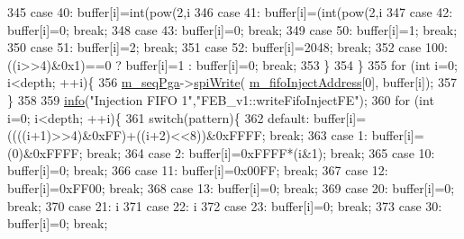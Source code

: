 \begin{DoxyCode}
345     \textcolor{keywordflow}{case} 40:  buffer[i]=int(pow(2,i%
346     \textcolor{keywordflow}{case} 41:  buffer[i]=(int(pow(2,i%
347     \textcolor{keywordflow}{case} 42:  buffer[i]=0; \textcolor{keywordflow}{break};
348     \textcolor{keywordflow}{case} 43:  buffer[i]=0; \textcolor{keywordflow}{break};
349     \textcolor{keywordflow}{case} 50:  buffer[i]=1; \textcolor{keywordflow}{break};
350     \textcolor{keywordflow}{case} 51:  buffer[i]=2; \textcolor{keywordflow}{break};
351     \textcolor{keywordflow}{case} 52:  buffer[i]=2048; \textcolor{keywordflow}{break};
352     \textcolor{keywordflow}{case} 100: ((i>>4)&0x1)==0 ? buffer[i]=1 : buffer[i]=0; \textcolor{keywordflow}{break};
353     \}
354    \}
355   \textcolor{keywordflow}{for} (\textcolor{keywordtype}{int} i=0; i<depth; ++i)\{
356     \hyperlink{classFEB__v1_a6c7804ac86796f233a8393043adf2e77}{m\_seqPga}->\hyperlink{classSeqPGA_ad4421841ce4ce8b88ad13f63216f0743}{spiWrite}( \hyperlink{classFEB__v1_afd035f292061e1823ed64471bb0228ef}{m\_fifoInjectAddress}[0], buffer[i]);
357   \}
358   
359   \hyperlink{classObject_a644fd329ea4cb85f54fa6846484b84a8}{info}(\textcolor{stringliteral}{"Injection FIFO 1"},\textcolor{stringliteral}{"FEB\_v1::writeFifoInjectFE"});        
360   \textcolor{keywordflow}{for} (\textcolor{keywordtype}{int} i=0; i<depth; ++i)\{ 
361     \textcolor{keywordflow}{switch}(pattern)\{
362     \textcolor{keywordflow}{default}:  buffer[i]=((((i+1)>>4)&0xFF)+((i+2)<<8))&0xFFFF; \textcolor{keywordflow}{break};
363     \textcolor{keywordflow}{case} 1:   buffer[i]=(0)&0xFFFF; \textcolor{keywordflow}{break};
364     \textcolor{keywordflow}{case} 2:   buffer[i]=0xFFFF*(i&1); \textcolor{keywordflow}{break};
365     \textcolor{keywordflow}{case} 10:  buffer[i]=0; \textcolor{keywordflow}{break};
366     \textcolor{keywordflow}{case} 11:  buffer[i]=0x00FF; \textcolor{keywordflow}{break};
367     \textcolor{keywordflow}{case} 12:  buffer[i]=0xFF00; \textcolor{keywordflow}{break};
368     \textcolor{keywordflow}{case} 13:  buffer[i]=0; \textcolor{keywordflow}{break};
369     \textcolor{keywordflow}{case} 20:  buffer[i]=0; \textcolor{keywordflow}{break};
370     \textcolor{keywordflow}{case} 21:  i%
371     \textcolor{keywordflow}{case} 22:  i%
372     \textcolor{keywordflow}{case} 23:  buffer[i]=0; \textcolor{keywordflow}{break};
373     \textcolor{keywordflow}{case} 30:  buffer[i]=0; \textcolor{keywordflow}{break};

\end{DoxyCode}
